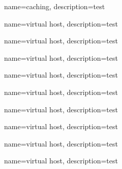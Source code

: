 {
	name={caching},
	description={test}
}

{
	name={virtual host},
	description={test}
}

{
	name={virtual host},
	description={test}
}

{
	name={virtual host},
	description={test}
}

{
	name={virtual host},
	description={test}
}

{
	name={virtual host},
	description={test}
}

{
	name={virtual host},
	description={test}
}

{
	name={virtual host},
	description={test}
}

{
	name={virtual host},
	description={test}
}

{
	name={virtual host},
	description={test}
}

